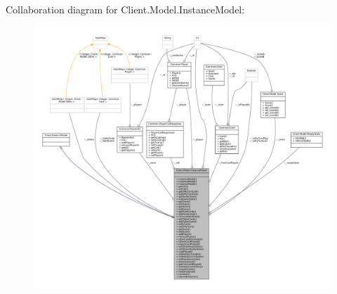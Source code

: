 Collaboration diagram for Client.\+Model.\+Instance\+Model\+:
\nopagebreak
\begin{figure}[H]
\begin{center}
\leavevmode
\includegraphics[width=350pt]{classClient_1_1Model_1_1InstanceModel__coll__graph}
\end{center}
\end{figure}
